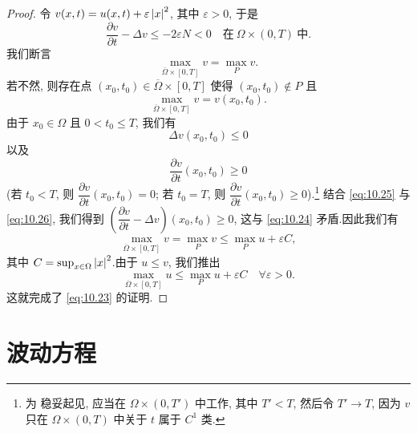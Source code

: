 \begin{proof}
令 $v(x,t)=u(x,t)+\varepsilon\left|x\right|^2$, 其中 $\varepsilon>0$, 于是
\begin{equation}
\frac{\partial v}{\partial t}-\Delta v\le-2\varepsilon N<0
\quad\text{在}\ \Omega\times(0,T)\ \text{中}.
\label{eq:10.24}
\end{equation}
我们断言
\begin{equation*}
\max_{\overline\Omega\times[0,T]}v=\max_Pv.
\end{equation*}
若不然, 则存在点 $(x_0,t_0)\in\overline\Omega\times[0,T]$ 使得
$(x_0,t_0)\notin P$ 且
\begin{equation*}
\max_{\overline\Omega\times[0,T]}v=v(x_0,t_0).
\end{equation*}
由于 $x_0\in\Omega$ 且 $0<t_0\le T$, 我们有
\begin{equation}
\Delta v(x_0,t_0)\le0
\label{eq:10.25}
\end{equation}
以及
\begin{equation}
\frac{\partial v}{\partial t}(x_0,t_0)\ge0
\label{eq:10.26}
\end{equation}
(若 $t_0<T$, 则 $\dfrac{\partial v}{\partial t}(x_0,t_0)=0$; 若
$t_0=T$, 则 $\dfrac{\partial v}{\partial t}(x_0,t_0)\ge0$).\footnote{为
稳妥起见, 应当在 $\Omega\times(0,T')$ 中工作, 其中 $T'<T$, 然后令
$T'\to T$, 因为 $v$ 只在 $\Omega\times(0,T)$ 中关于 $t$ 属于 $C^1$ 类.}
结合 \eqref{eq:10.25} 与 \eqref{eq:10.26}, 我们得到
$\left(\dfrac{\partial v}{\partial t}-\Delta v\right)(x_0,t_0)\ge0$, 这与
\eqref{eq:10.24} 矛盾.因此我们有
\begin{equation*}
\max_{\overline\Omega\times[0,T]}v=\max_Pv\le\max_Pu+\varepsilon C,
\end{equation*}
其中 $C=\sup_{x\in\Omega}\left|x\right|^2$.由于 $u\le v$, 我们推出
\begin{equation*}
\max_{\overline\Omega\times[0,T]}u\le\max_Pu+\varepsilon C
\quad\forall\varepsilon>0.
\end{equation*}
这就完成了 \eqref{eq:10.23} 的证明.
\end{proof}

\section{波动方程}
\label{sec:10.3}

